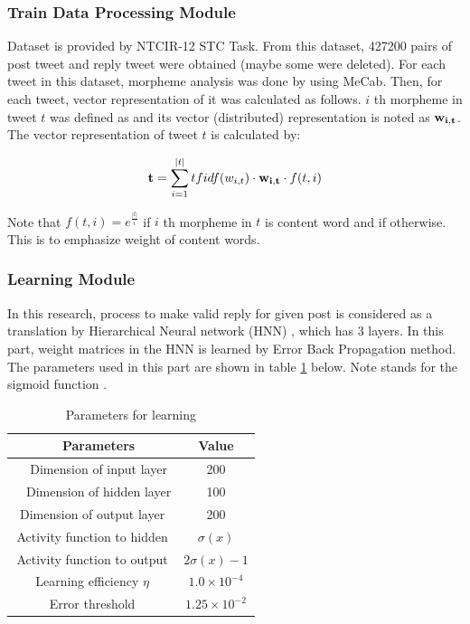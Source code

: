 \documentclass{../style/sig-alternate}
\begin{document}
\subsubsection{Train Data Processing Module}

Dataset is provided by NTCIR-12 STC Task.
From this dataset, 427200 pairs of post tweet and reply tweet were obtained (maybe some were deleted).
For each tweet in this dataset, morpheme analysis was done by using MeCab\cite{mecab}.
Then, for each tweet, vector representation of it was calculated as follows.
$ i $ th morpheme in tweet $ t $ was defined as  and its vector (distributed) representation is noted as $ {\bf w_{i,t}} $.
The vector representation of tweet $ t $ is calculated by:

\begin{eqnarray}
 {\bf t} = \sum_{i=1}^{|t|} tfidf(w_{i,t}) \cdot {\bf w_{i,t}} \cdot f(t,i)
\end{eqnarray}

Note that $ f(t,i) = e^{\frac{|l|}{i}} $ if $ i $ th morpheme in $ t $ is content word and  if otherwise.
This is to emphasize weight of content words.

\subsubsection{Learning Module}

In this research, process to make valid reply for given post is considered as a translation by Hierarchical Neural network (HNN) , which has 3 layers.
In this part, weight matrices in the HNN is learned by Error Back Propagation method\cite{bahman}.
The parameters used in this part are shown in table \ref{tab:hnn_parameters} below.
Note  stands for the sigmoid function .

\begin{table}[h!]
  \centering
  \caption{Parameters for learning}
  \label{tab:hnn_parameters}
  \begin{tabular}{|c|c|} \hline
    　{\bf Parameters} & {\bf Value} \\ \hline
    　Dimension of input layer & 200 \\ \hline
    　Dimension of hidden layer & 100 \\ \hline
    Dimension of output layer & 200 \\ \hline
    Activity function to hidden & $ \sigma ( x ) $ \\ \hline
    Activity function to output & $ 2 \sigma ( x ) - 1 $ \\ \hline
    Learning efficiency $ \eta $ & $ 1.0 \times 10^{-4} $ \\ \hline
    Error threshold & $ 1.25 \times 10^{-2} $ \\ \hline
  \end{tabular}
\end{table}
\end{document}
